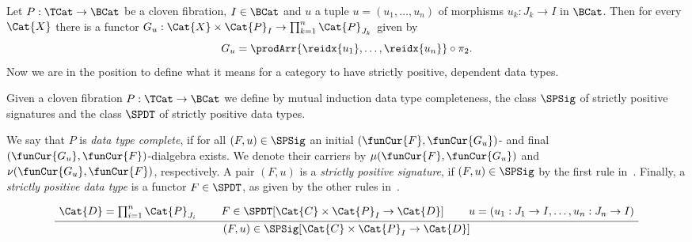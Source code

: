 \documentclass[preprint]{sigplanconf}
\begin{document}
Let $P : \TCat \to \BCat$ be a cloven fibration, $I \in \BCat$ and $u$
a tuple $u = (u_1, \dotsc, u_n)$ of morphisms $u_k : J_k \to I$ in $\BCat$.
Then for every $\Cat{X}$ there is a functor
$G_u : \Cat{X} \times \Cat{P}_I \to \prod_{k=1}^n \Cat{P}_{J_k}$ given by
\begin{equation}
  \label{eq:signature-reidx-fun}
  G_u = \prodArr{\reidx{u_1}, \dotsc, \reidx{u_n}} \circ \pi_2.
\end{equation}
Now we are in the position to define what it means for a category to have
strictly positive, dependent data types.
\begin{definition}
  \label{def:dt-complete}
  Given a cloven fibration $P : \TCat \to \BCat$ we define by mutual induction
  data type completeness, the class $\SPSig$ of strictly
  positive signatures and the class $\SPDT$ of strictly positive data
  types.


  We say that $P$ is \emph{data type complete}, if for all $(F, u) \in \SPSig$
  an initial $(\funCur{F}, \funCur{G_u})$- and final
  $(\funCur{G_u}, \funCur{F})$-dialgebra exists.
  We denote their carriers by  $\mu (\funCur{F}, \funCur{G_u})$ and
  $\nu (\funCur{G_u}, \funCur{F})$, respectively.
  A pair $(F, u)$ is a \emph{strictly positive signature}, if
  $(F, u) \in \SPSig$ by the first rule in~.
  Finally, a \emph{strictly positive data type} is a functor $F \in \SPDT$,
  as given by the other rules in~.

  \begin{figure*}
    \centering
    \begin{equation*}
      \AxiomC{$\Cat{D} = \prod_{i = 1}^n \Cat{P}_{J_i}$}
      \AxiomC{$F \in \SPDT[\Cat{C} \times \Cat{P}_I \to \Cat{D}]$}
      \AxiomC{$u = (u_1 : J_1 \to I, \dotsc, u_n : J_n \to I)$}
      \TrinaryInfC{$(F, u) \in \SPSig[\Cat{C} \times \Cat{P}_I \to \Cat{D}]$}
      \DisplayProof
    \end{equation*}


\end{figure*}
\end{definition}
\end{document}
